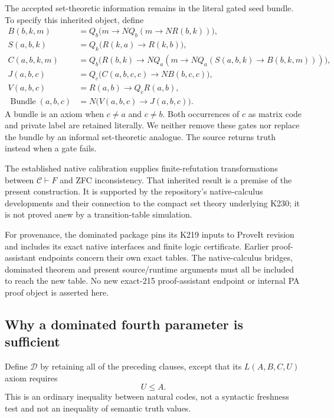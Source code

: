 The accepted set-theoretic information remains in the literal gated seed
bundle.  To specify this inherited object, define
\begin{align*}
 B(b,k,m)&=Q_b\bigl(m\to NQ_b(m\to NR(b,k))\bigr),\\
 S(a,b,k)&=Q_k\bigl(R(k,a)\to R(k,b)\bigr),\\
 C(a,b,k,m)&=Q_b\bigl(R(b,k)\to
           NQ_a(m\to NQ_a(S(a,b,k)\to B(b,k,m)))\bigr),\\
 J(a,b,c)&=Q_c\bigl(C(a,b,c,c)\to NB(b,c,c)\bigr),\\
 V(a,b,c)&=R(a,b)\to Q_cR(a,b),\\
 \operatorname{Bundle}(a,b,c)&=N\bigl(V(a,b,c)\to J(a,b,c)\bigr).
\end{align*}
A bundle is an axiom when $c\ne a$ and $c\ne b$.  Both occurrences of
$c$ as matrix code and private label are retained literally.  We neither
remove these gates nor replace the bundle by an informal set-theoretic
analogue.  The source returns truth instead when a gate fails.

The established native calibration supplies finite-refutation
transformations between $\mathcal C\vdash F$ and ZFC inconsistency.
That inherited result is a premise of the present construction.  It is
supported by the repository's native-calculus developments and their
connection to the compact set theory underlying K230; it is not proved
anew by a transition-table simulation.

For provenance, the dominated package pins its K219 inputs to ProveIt
revision  and includes
its exact native interfaces and finite logic certificate.  Earlier proof-assistant endpoints concern their own exact tables. The
native-calculus bridges, dominated theorem and present source/runtime
arguments must all be included to reach the new table. No new exact-215
proof-assistant endpoint or internal PA proof object is asserted here.

\subsection{Why a dominated fourth parameter is sufficient}

Define $\mathcal D$ by retaining all of the preceding clauses, except
that its $L(A,B,C,U)$ axiom requires
\[
                         U\le A.                 \tag{D}
\]
This is an ordinary inequality between natural codes, not a syntactic
freshness test and not an inequality of semantic truth values.

